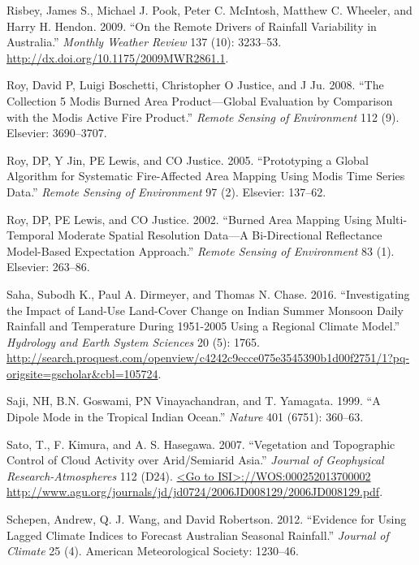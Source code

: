 \documentclass[fleqn,10pt,lineno]{wlpeerj} %
\begin{document}
\hypertarget{ref-Risbey2009}{}
Risbey, James S., Michael J. Pook, Peter C. McIntosh, Matthew C.
Wheeler, and Harry H. Hendon. 2009. ``On the Remote Drivers of Rainfall
Variability in Australia.'' \emph{Monthly Weather Review} 137 (10):
3233--53. \url{http://dx.doi.org/10.1175/2009MWR2861.1}.

\hypertarget{ref-Roy2008}{}
Roy, David P, Luigi Boschetti, Christopher O Justice, and J Ju. 2008.
``The Collection 5 Modis Burned Area Product---Global Evaluation by
Comparison with the Modis Active Fire Product.'' \emph{Remote Sensing of
Environment} 112 (9). Elsevier: 3690--3707.

\hypertarget{ref-Roy2005}{}
Roy, DP, Y Jin, PE Lewis, and CO Justice. 2005. ``Prototyping a Global
Algorithm for Systematic Fire-Affected Area Mapping Using Modis Time
Series Data.'' \emph{Remote Sensing of Environment} 97 (2). Elsevier:
137--62.

\hypertarget{ref-Roy2002}{}
Roy, DP, PE Lewis, and CO Justice. 2002. ``Burned Area Mapping Using
Multi-Temporal Moderate Spatial Resolution Data---A Bi-Directional
Reflectance Model-Based Expectation Approach.'' \emph{Remote Sensing of
Environment} 83 (1). Elsevier: 263--86.

\hypertarget{ref-saha_investigating_2016}{}
Saha, Subodh K., Paul A. Dirmeyer, and Thomas N. Chase. 2016.
``Investigating the Impact of Land-Use Land-Cover Change on Indian
Summer Monsoon Daily Rainfall and Temperature During 1951-2005 Using a
Regional Climate Model.'' \emph{Hydrology and Earth System Sciences} 20
(5): 1765.
\url{http://search.proquest.com/openview/c4242c9ecce075e3545390b1d00f2751/1?pq-origsite=gscholar\&cbl=105724}.

\hypertarget{ref-Saji1999}{}
Saji, NH, B.N. Goswami, PN Vinayachandran, and T. Yamagata. 1999. ``A
Dipole Mode in the Tropical Indian Ocean.'' \emph{Nature} 401 (6751):
360--63.

\hypertarget{ref-Sato2007}{}
Sato, T., F. Kimura, and A. S. Hasegawa. 2007. ``Vegetation and
Topographic Control of Cloud Activity over Arid/Semiarid Asia.''
\emph{Journal of Geophysical Research-Atmospheres} 112 (D24).
\href{\%3CGo\%20to\%20ISI\%3E://WOS:000252013700002\%20http://www.agu.org/journals/jd/jd0724/2006JD008129/2006JD008129.pdf}{\textless{}Go to ISI\textgreater{}://WOS:000252013700002 http://www.agu.org/journals/jd/jd0724/2006JD008129/2006JD008129.pdf}.

\hypertarget{ref-Schepen2012}{}
Schepen, Andrew, Q. J. Wang, and David Robertson. 2012. ``Evidence for
Using Lagged Climate Indices to Forecast Australian Seasonal Rainfall.''
\emph{Journal of Climate} 25 (4). American Meteorological Society:
1230--46.
\end{document}
